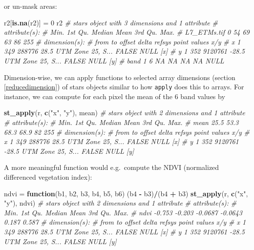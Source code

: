 \documentclass[]{book}
\newenvironment{Shaded}{\begin{snugshade}}{\end{snugshade}}
\newcommand{\CommentTok}[1]{\textcolor[rgb]{0.56,0.35,0.01}{\textit{#1}}}
\newcommand{\ControlFlowTok}[1]{\textcolor[rgb]{0.13,0.29,0.53}{\textbf{#1}}}
\newcommand{\DecValTok}[1]{\textcolor[rgb]{0.00,0.00,0.81}{#1}}
\newcommand{\KeywordTok}[1]{\textcolor[rgb]{0.13,0.29,0.53}{\textbf{#1}}}
\newcommand{\NormalTok}[1]{#1}
\newcommand{\OperatorTok}[1]{\textcolor[rgb]{0.81,0.36,0.00}{\textbf{#1}}}
\newcommand{\StringTok}[1]{\textcolor[rgb]{0.31,0.60,0.02}{#1}}
\begin{document}
or un-mask areas:

\begin{Shaded}
\begin{Highlighting}[]
\NormalTok{r2[}\KeywordTok{is.na}\NormalTok{(r2)] =}\StringTok{ }\DecValTok{0}
\NormalTok{r2}
\CommentTok{# stars object with 3 dimensions and 1 attribute}
\CommentTok{# attribute(s):}
\CommentTok{#              Min. 1st Qu. Median Mean 3rd Qu. Max.}
\CommentTok{# L7_ETMs.tif     0      54     69   63      86  255}
\CommentTok{# dimension(s):}
\CommentTok{#      from  to  offset delta            refsys point values x/y}
\CommentTok{# x       1 349  288776  28.5 UTM Zone 25, S... FALSE   NULL [x]}
\CommentTok{# y       1 352 9120761 -28.5 UTM Zone 25, S... FALSE   NULL [y]}
\CommentTok{# band    1   6      NA    NA                NA    NA   NULL}
\end{Highlighting}
\end{Shaded}

Dimension-wise, we can apply functions to selected array dimensions
(section \ref{reducedimension})
of stars objects similar to how \texttt{apply} does this to arrays. For
instance, we can compute for each pixel the mean of the 6 band values by

\begin{Shaded}
\begin{Highlighting}[]
\KeywordTok{st_apply}\NormalTok{(r, }\KeywordTok{c}\NormalTok{(}\StringTok{"x"}\NormalTok{, }\StringTok{"y"}\NormalTok{), mean)}
\CommentTok{# stars object with 2 dimensions and 1 attribute}
\CommentTok{# attribute(s):}
\CommentTok{#       Min. 1st Qu. Median Mean 3rd Qu. Max.}
\CommentTok{# mean  25.5    53.3   68.3 68.9      82  255}
\CommentTok{# dimension(s):}
\CommentTok{#   from  to  offset delta            refsys point values x/y}
\CommentTok{# x    1 349  288776  28.5 UTM Zone 25, S... FALSE   NULL [x]}
\CommentTok{# y    1 352 9120761 -28.5 UTM Zone 25, S... FALSE   NULL [y]}
\end{Highlighting}
\end{Shaded}

A more meaningful function would e.g.~compute the NDVI (normalized
differenced vegetation index):

\begin{Shaded}
\begin{Highlighting}[]
\NormalTok{ndvi =}\StringTok{ }\ControlFlowTok{function}\NormalTok{(b1, b2, b3, b4, b5, b6) (b4 }\OperatorTok{-}\StringTok{ }\NormalTok{b3)}\OperatorTok{/}\NormalTok{(b4 }\OperatorTok{+}\StringTok{ }\NormalTok{b3)}
\KeywordTok{st_apply}\NormalTok{(r, }\KeywordTok{c}\NormalTok{(}\StringTok{"x"}\NormalTok{, }\StringTok{"y"}\NormalTok{), ndvi)}
\CommentTok{# stars object with 2 dimensions and 1 attribute}
\CommentTok{# attribute(s):}
\CommentTok{#         Min. 1st Qu.  Median    Mean 3rd Qu.  Max.}
\CommentTok{# ndvi  -0.753  -0.203 -0.0687 -0.0643   0.187 0.587}
\CommentTok{# dimension(s):}
\CommentTok{#   from  to  offset delta            refsys point values x/y}
\CommentTok{# x    1 349  288776  28.5 UTM Zone 25, S... FALSE   NULL [x]}
\CommentTok{# y    1 352 9120761 -28.5 UTM Zone 25, S... FALSE   NULL [y]}
\end{Highlighting}
\end{Shaded}
\end{document}
